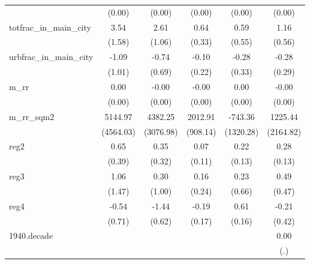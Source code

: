 {\begin{tabular}{l*{5}{c}}
          &   (0.00)         &   (0.00)         &   (0.00)         &   (0.00)         &   (0.00)         \\
\addlinespace
totfrac\_in\_main\_city&     3.54\sym{*}  &     2.61\sym{*}  &     0.64         &     0.59         &     1.16\sym{*}  \\
          &   (1.58)         &   (1.06)         &   (0.33)         &   (0.55)         &   (0.56)         \\
\addlinespace
urbfrac\_in\_main\_city&    -1.09         &    -0.74         &    -0.10         &    -0.28         &    -0.28         \\
          &   (1.01)         &   (0.69)         &   (0.22)         &   (0.33)         &   (0.29)         \\
\addlinespace
m\_rr      &     0.00         &    -0.00         &    -0.00         &     0.00\sym{***}&    -0.00         \\
          &   (0.00)         &   (0.00)         &   (0.00)         &   (0.00)         &   (0.00)         \\
\addlinespace
m\_rr\_sqm2 &  5144.97         &  4382.25         &  2012.91\sym{*}  &  -743.36         &  1225.44         \\
          &(4564.03)         &(3076.98)         & (908.14)         &(1320.28)         &(2164.82)         \\
\addlinespace
reg2      &     0.65         &     0.35         &     0.07         &     0.22         &     0.28\sym{*}  \\
          &   (0.39)         &   (0.32)         &   (0.11)         &   (0.13)         &   (0.13)         \\
\addlinespace
reg3      &     1.06         &     0.30         &     0.16         &     0.23         &     0.49         \\
          &   (1.47)         &   (1.00)         &   (0.24)         &   (0.66)         &   (0.47)         \\
\addlinespace
reg4      &    -0.54         &    -1.44\sym{*}  &    -0.19         &     0.61\sym{***}&    -0.21         \\
          &   (0.71)         &   (0.62)         &   (0.17)         &   (0.16)         &   (0.42)         \\
\addlinespace
1940.decade&                  &                  &                  &                  &     0.00         \\
          &                  &                  &                  &                  &      (.)         \\

\end{tabular}}
